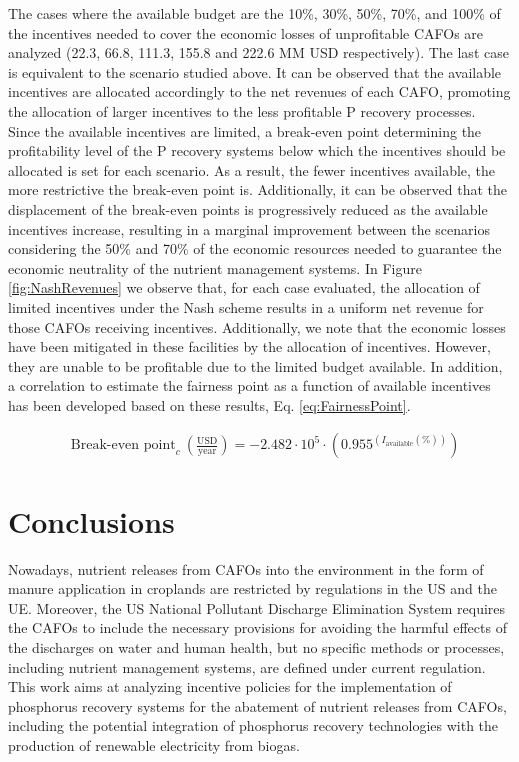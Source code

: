 \begin{refsection}[referencesCh5]
The cases where the available budget are the 10\%, 30\%, 50\%, 70\%, and 100\% of the incentives needed to cover the economic losses of unprofitable CAFOs are analyzed (22.3, 66.8, 111.3, 155.8 and 222.6 MM USD respectively). The last case is equivalent to the scenario studied above. It can be observed that the available incentives are allocated accordingly to the net revenues of each CAFO, promoting the allocation of larger incentives to the less profitable P recovery processes. Since the available incentives are limited, a break-even point determining the profitability level of the P recovery systems below which the incentives should be allocated is set for each scenario. As a result, the fewer incentives available, the more restrictive the break-even point is. Additionally, it can be observed that the displacement of the break-even points is progressively reduced as the available incentives increase, resulting in a marginal improvement between the scenarios considering the 50\% and 70\% of the economic resources needed to guarantee the economic neutrality of the nutrient management systems. In Figure \ref{fig:NashRevenues} we observe that, for each case evaluated, the allocation of limited incentives under the Nash scheme results in a uniform net revenue for those CAFOs receiving incentives. Additionally, we note that the economic losses have been mitigated in these facilities by the allocation of incentives. However, they are unable to be profitable due to the limited budget available. In addition, a correlation to estimate the fairness point as a function of available incentives has been developed based on these results, Eq. \ref{eq:FairnessPoint}.

\begin{align}
& \text{Break-even point}_c \ \left(\frac{\text{USD}}{\text{year}}\right) = -2.482\cdot10^{5} \cdot \left(0.955^{\left(I_{\text{available}}\left( \% \right) \right)}\right) \label{eq:FairnessPoint}
\end{align}

\section{Conclusions}
Nowadays, nutrient releases from CAFOs into the environment in the form of manure application in croplands are restricted by regulations in the US and the UE. Moreover, the US National Pollutant Discharge Elimination System requires the CAFOs to include the necessary provisions for avoiding the harmful effects of the discharges on water and human health, but no specific methods or processes, including nutrient management systems, are defined under current regulation. This work aims at analyzing incentive policies for the implementation of phosphorus recovery systems for the abatement of nutrient releases from CAFOs, including the potential integration of phosphorus recovery technologies with the production of renewable electricity from biogas.


\end{refsection}
